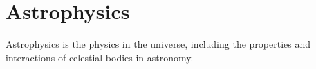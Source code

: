 \chapter{Astrophysics}
\thispagestyle{fancy}

Astrophysics is the physics in the universe, including the properties and interactions of celestial bodies in astronomy.
